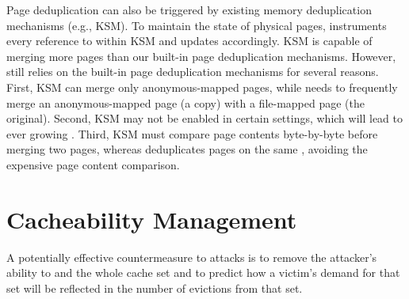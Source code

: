 Page deduplication can also be triggered by existing memory
deduplication mechanisms (e.g., \gls{KSM}). To maintain the state of
physical pages, \cachebar instruments every reference to \mapcount
within \gls{KSM} and updates \pcounterincontainer accordingly.
\gls{KSM} is capable of merging more pages than our built-in page
deduplication mechanisms.  However, \cachebar still relies on the built-in page
deduplication mechanisms for several reasons. First, \gls{KSM} can merge only
anonymous-mapped pages, while \cachebar needs to frequently merge an
anonymous-mapped page (a copy) with a file-mapped page (the original). Second,
\gls{KSM} may not be enabled in certain settings, which will lead to ever growing
.  Third, \gls{KSM} must compare page contents byte-by-byte before
merging two pages, whereas \cachebar deduplicates pages on the
same \copypagelist, avoiding the expensive page content comparison.


\section{Cacheability Management}
\label{cachebar:sec:cacheabilityMgmt}

A potentially effective countermeasure to \primeprobe attacks is to
remove the attacker's ability to \Prime and \Probe the whole cache set
and to predict how a victim's demand for that set will be reflected in
the number of evictions from that set.

